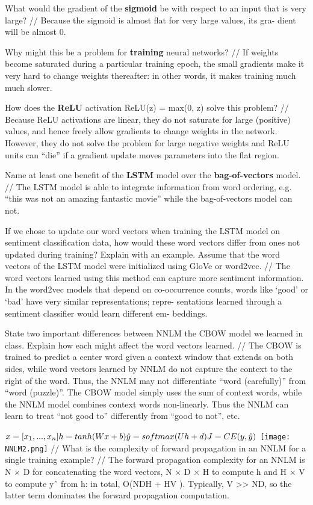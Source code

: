 What would the gradient of the \textbf{sigmoid} be with respect to an input that is very large? // Because the sigmoid is almost flat for very large values, its gra- dient will be almost 0.

Why might this be a problem for \textbf{training} neural networks? //
If weights become saturated during a particular training epoch, the small gradients make it very hard to change weights thereafter: in other words, it makes training much much slower.

How does the \textbf{ReLU} activation ReLU(z) = max(0, z) solve this problem? //
Because ReLU activations are linear, they do not saturate for large (positive) values, and hence freely allow gradients to change weights in the network. However, they do not solve the problem for large negative weights and ReLU units can “die” if a gradient update moves parameters into the flat region.

Name at least one benefit of the \textbf{LSTM} model over the \textbf{bag-of-vectors} model. //
The LSTM model is able to integrate information from word ordering, e.g. “this was not an amazing fantastic movie” while the bag-of-vectors model can not.

If we chose to update our word vectors when training the LSTM model on sentiment classification data, how would these word vectors differ from ones not updated during training? Explain with an example. Assume that the word vectors of the LSTM model were initialized using GloVe or word2vec. //
The word vectors learned using this method can capture more sentiment information. In the word2vec models that depend on co-occurrence counts, words like ‘good’ or ‘bad’ have very similar representations; repre- sentations learned through a sentiment classifier would learn different em- beddings.

State two important differences between NNLM the CBOW model we learned in class. Explain how each might affect the word vectors learned. //
The CBOW is trained to predict a center word given a context window that extends on both sides, while word vectors learned by NNLM do not capture the context to the right of the word. Thus, the NNLM may not differentiate “word (carefully)” from “word (puzzle)”.
The CBOW model simply uses the sum of context words, while the NNLM model combines context words non-linearly. Thus the NNLM can learn to treat “not good to” differently from “good to not”, etc.

$x=[x_1,...,x_n] \\
h=tanh(Wx+b) \\
\hat y=softmax(Uh+d) \\
J=CE(y,\hat y) \\
$
\texttt{[image: NNLM2.png]}
//
What is the complexity of forward propagation in an NNLM for a single training example? //
The forward propagation complexity for an NNLM is N × D for concatenating the word vectors, N × D × H to compute h and H × V to compute yˆ from h: in total, O(NDH + HV ). Typically, V >> ND, so the latter term dominates the forward propagation computation.

